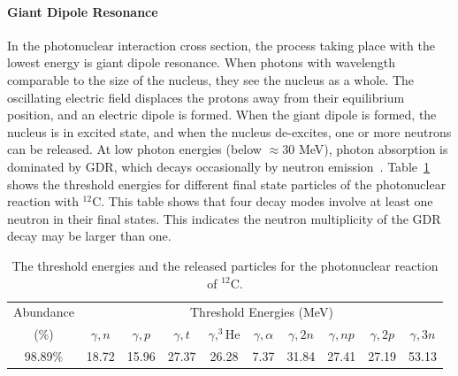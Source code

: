 \paragraph{Giant Dipole Resonance}
In the photonuclear interaction cross section, the process taking place with the lowest energy is giant dipole resonance. When photons with wavelength comparable to the size of the nucleus, they see the nucleus as a whole. The oscillating electric field displaces the protons away from their equilibrium position, and an electric dipole is formed. When the giant dipole is formed, the nucleus is in excited state, and when the nucleus de-excites, one or more neutrons can be released. At low photon energies (below $\approx 30$ MeV), photon absorption is dominated by GDR, which decays occasionally by neutron emission~\cite{Bortignon1998}. Table~\ref{table:GDR_carbon}~\cite{IAEALib} shows the threshold energies for different final state particles of the photonuclear reaction with $^{12}$C. This table shows that four decay modes involve at least one neutron in their final states. This indicates the neutron multiplicity of the GDR decay may be larger than one.
\begin{table}
	\centering
	\begin{tabular}{cccccccccc}
	\hline
	Abundance & \multicolumn{9}{c}{Threshold Energies (MeV)} \\
	($\%$) & $\gamma,n$ & $\gamma,p$ & $\gamma,t$ & $\gamma,^3$He & $\gamma,\alpha$ & $\gamma,2n$ & $\gamma,np$ & $\gamma,2p$& $\gamma,3n$ \\
	\hline
	98.89$\%$ & 18.72 & 15.96 & 27.37 & 26.28 & 7.37 & 31.84 & 27.41 & 27.19 & 53.13 \\
	\hline
	\end{tabular}
	\caption{The threshold energies and the released particles for the photonuclear reaction of $^{12}$C.}
	\label{table:GDR_carbon}
\end{table}




